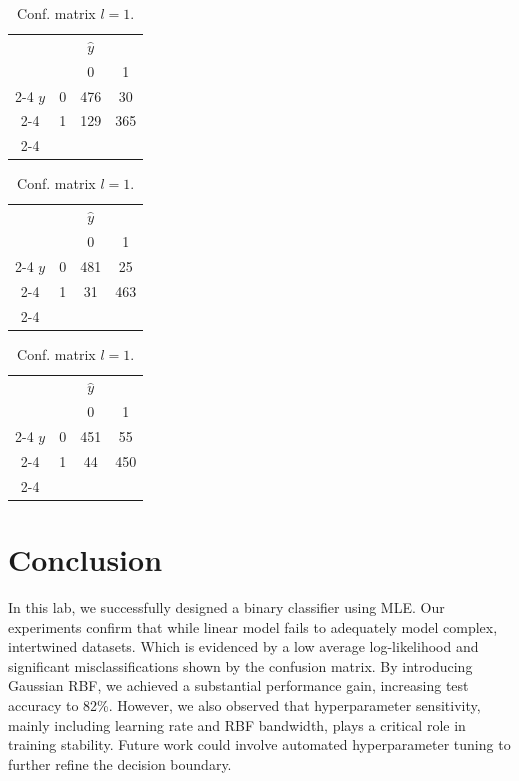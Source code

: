 \documentclass[english]{article}
\providecommand{\tabularnewline}{\\}
\begin{document}
\begin{table}
\centering{}%
\begin{minipage}[t]{0.33\textwidth}%
\begin{center}
\begin{tabular}{cc|c|c}
 & \multicolumn{1}{c}{} & \multicolumn{1}{c}{$\hat{y}$} & \tabularnewline
 &  & 0 & 1\tabularnewline
\cline{2-4} 
$y$ & 0 & 476 & 30\tabularnewline
\cline{2-4} 
 & 1 & 129 & 365\tabularnewline
\cline{2-4} 
\end{tabular} 
\par\end{center}
\caption{Conf. matrix $l=0.01$.\label{tab:conf_l_001}}
%
\end{minipage}%
\begin{minipage}[t]{0.33\textwidth}%
\begin{center}
\begin{tabular}{cc|c|c}
 & \multicolumn{1}{c}{} & \multicolumn{1}{c}{$\hat{y}$} & \tabularnewline
 &  & 0 & 1\tabularnewline
\cline{2-4} 
$y$ & 0 & 481 & 25\tabularnewline
\cline{2-4} 
 & 1 & 31 & 463\tabularnewline
\cline{2-4} 
\end{tabular} 
\par\end{center}
\caption{Conf. matrix $l=0.1$.\label{tab:conf_l_01}}
%
\end{minipage}%
\begin{minipage}[t]{0.33\textwidth}%
\begin{center}
\begin{tabular}{cc|c|c}
 & \multicolumn{1}{c}{} & \multicolumn{1}{c}{$\hat{y}$} & \tabularnewline
 &  & 0 & 1\tabularnewline
\cline{2-4} 
$y$ & 0 & 451 & 55\tabularnewline
\cline{2-4} 
 & 1 & 44 & 450\tabularnewline
\cline{2-4} 
\end{tabular} 
\par\end{center}
\caption{Conf. matrix $l=1$.\label{tab:conf_l_1}}
%
\end{minipage}
\end{table}


\section{Conclusion}
In this lab, we successfully designed 
a binary classifier using MLE. 
Our experiments confirm that while linear model
fails to adequately model complex, 
intertwined datasets. Which is evidenced by a 
low average log-likelihood and 
significant misclassifications shown by the
confusion matrix. By introducing Gaussian 
RBF, we achieved a substantial 
performance gain, increasing test accuracy to 82\%. 
However, we also observed that hyperparameter 
sensitivity, mainly including learning rate 
and RBF bandwidth, plays a critical role in 
training stability. 
Future work could involve automated 
hyperparameter tuning to further 
refine the decision boundary.
\end{document}
